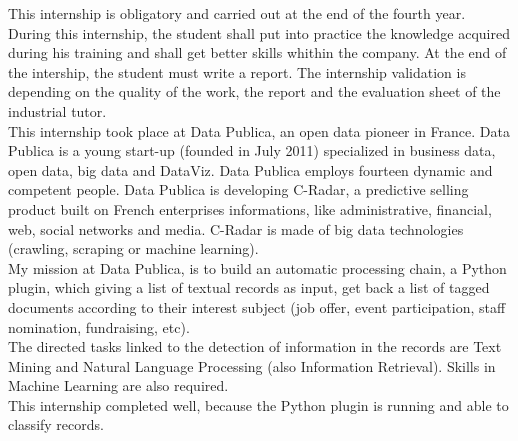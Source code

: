This internship is obligatory and carried out at the end of the fourth year. During this internship, the student shall put into practice the knowledge acquired during his training and shall get better skills whithin the company. At the end of the intership, the student must write a report. The internship validation is depending on the quality of the work, the report and the evaluation sheet of the industrial tutor.\\
This internship took place at Data Publica, an open data pioneer in France. Data Publica is a young start-up (founded in July 2011) specialized in business data, open data, big data and DataViz. Data Publica employs fourteen dynamic and competent people. Data Publica is developing C-Radar, a predictive selling product built on French enterprises informations, like administrative, financial, web, social networks and media. C-Radar is made of big data technologies (crawling, scraping or machine learning).\\
My mission at Data Publica, is to build an automatic processing chain, a Python plugin, which giving a list of textual records as input, get back a list of tagged documents according to their interest subject (job offer, event participation, staff nomination, fundraising, etc).\\
The directed tasks linked to the detection of information in the records are Text Mining and Natural Language Processing (also Information Retrieval). Skills in Machine Learning are also required.\\
This internship completed well, because the Python plugin is running and able to classify records.